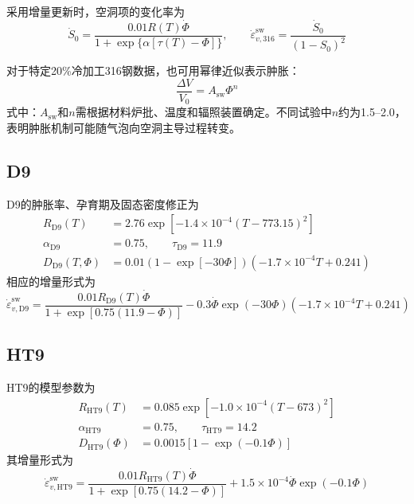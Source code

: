 采用增量更新时，空洞项的变化率为
\begin{equation}
	\dot S_0
	=\frac{0.01R(T)\dot\Phi}
	{1+\exp\{\alpha[\tau(T)-\Phi]\}},
	\qquad
	\dot\varepsilon_{v,316}^{\mathrm{sw}}
	=\frac{\dot S_0}{(1-S_0)^2}
	\label{eq:appendix_ss316_swelling_rate}
\end{equation}

对于特定20\%冷加工316钢数据，也可用幂律近似表示肿胀：
\begin{equation}
	\frac{\Delta V}{V_0}=A_{\mathrm{sw}}\Phi^n
	\label{eq:appendix_cw316_power_law_swelling}
\end{equation}
式中：$A_{\mathrm{sw}}$和$n$需根据材料炉批、温度和辐照装置确定。不同试验中$n$约为1.5--2.0，表明肿胀机制可能随气泡向空洞主导过程转变。

\subsection{D9}

D9的肿胀率、孕育期及固态密度修正为
\begin{equation}
	\label{eq:appendix_d9_swelling_parameters}
	\begin{aligned}
		R_{\mathrm{D9}}(T)
		&=2.76\exp[-1.4\times10^{-4}(T-773.15)^2]\\
		\alpha_{\mathrm{D9}}&=0.75,
		\qquad
		\tau_{\mathrm{D9}}=11.9\\
		D_{\mathrm{D9}}(T,\Phi)
		&=0.01(1-\exp[-30\Phi])
		(-1.7\times10^{-4}T+0.241)
	\end{aligned}
\end{equation}
相应的增量形式为
\begin{equation}
	\dot\varepsilon_{v,\mathrm{D9}}^{\mathrm{sw}}
	=\frac{0.01R_{\mathrm{D9}}(T)\dot\Phi}
	{1+\exp[0.75(11.9-\Phi)]}
	-0.3\dot\Phi\exp(-30\Phi)
	(-1.7\times10^{-4}T+0.241)
	\label{eq:appendix_d9_swelling_rate}
\end{equation}

\subsection{HT9}

HT9的模型参数为
\begin{equation}
	\label{eq:appendix_ht9_swelling_parameters}
	\begin{aligned}
		R_{\mathrm{HT9}}(T)
		&=0.085\exp[-1.0\times10^{-4}(T-673)^2]\\
		\alpha_{\mathrm{HT9}}&=0.75,
		\qquad
		\tau_{\mathrm{HT9}}=14.2\\
		D_{\mathrm{HT9}}(\Phi)
		&=0.0015[1-\exp(-0.1\Phi)]
	\end{aligned}
\end{equation}
其增量形式为
\begin{equation}
	\dot\varepsilon_{v,\mathrm{HT9}}^{\mathrm{sw}}
	=\frac{0.01R_{\mathrm{HT9}}(T)\dot\Phi}
	{1+\exp[0.75(14.2-\Phi)]}
	+1.5\times10^{-4}\dot\Phi\exp(-0.1\Phi)
	\label{eq:appendix_ht9_swelling_rate}
\end{equation}

